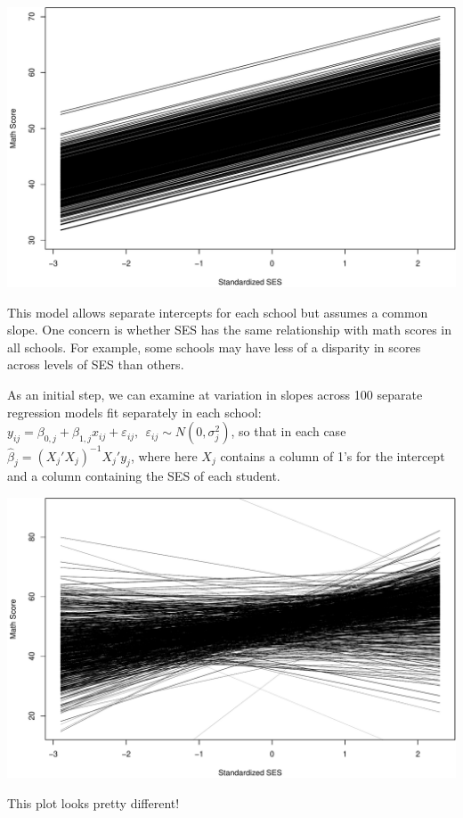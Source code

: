 \documentclass[ignorenonframetext,]{beamer}
\begin{document}
\begin{frame}{}

\includegraphics{ancova_01_deck_files/figure-beamer/schoolspecific1b-1.pdf}

\end{frame}

\begin{frame}{}

This model allows separate intercepts for each school but assumes a
common slope. One concern is whether SES has the same relationship with
math scores in all schools. For example, some schools may have less of a
disparity in scores across levels of SES than others.

As an initial step, we can examine at variation in slopes across 100
separate regression models fit separately in each school:
\(y_{ij}=\beta_{0,j}+\beta_{1,j}x_{ij}+\varepsilon_{ij}, ~~ \varepsilon_{ij} \sim N(0,\sigma^2_j)\),
so that in each case \(\widehat{\beta}_j=(X_j'X_j)^{-1}X_j'y_j\), where
here \(X_j\) contains a column of 1's for the intercept and a column
containing the SES of each student.

\end{frame}

\begin{frame}{}

\includegraphics{ancova_01_deck_files/figure-beamer/schoolspecific2b-1.pdf}

This plot looks pretty different!

\end{frame}
\end{document}
